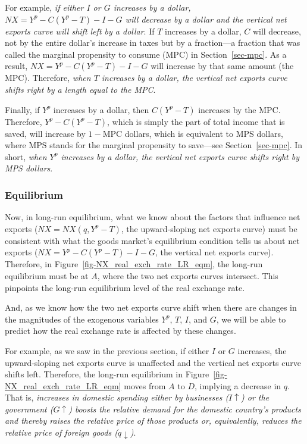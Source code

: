 \documentclass[
  letterpaper,
]{book}
\theoremstyle{plain}
\theoremstyle{remark}
\begin{document}
For example, \emph{if either \(I\) or \(G\) increases by a dollar,
\(NX=Y^p-C(Y^p-T)-I-G\) will decrease by a dollar and the vertical net
exports curve will shift left by a dollar}. If \(T\) increases by a
dollar, \(C\) will decrease, not by the entire dollar's increase in
taxes but by a fraction---a fraction that was called the marginal
propensity to consume (MPC) in Section~\ref{sec-mpc}. As a result,
\(NX=Y^p-C(Y^p-T)-I-G\) will increase by that same amount (the MPC).
Therefore, \emph{when \(T\) increases by a dollar, the vertical net
exports curve shifts right by a length equal to the MPC}.

Finally, if \(Y^p\) increases by a dollar, then \(C(Y^p-T)\) increases
by the MPC. Therefore, \(Y^p-C(Y^p-T)\), which is simply the part of
total income that is saved, will increase by \(1-\text{MPC}\) dollars,
which is equivalent to MPS dollars, where MPS stands for the marginal
propensity to save---see Section~\ref{sec-mpc}. In short, \emph{when
\(Y^p\) increases by a dollar, the vertical net exports curve shifts
right by MPS dollars}.

\subsubsection{Equilibrium}\label{sec-eqm-no-appp}

Now, in long-run equilibrium, what we know about the factors that
influence net exports (\(NX=NX(q,Y^p-T)\), the upward-sloping net
exports curve) must be consistent with what the goods market's
equilibrium condition tells us about net exports
(\(NX=Y^p-C(Y^p-T)-I-G\), the vertical net exports curve). Therefore, in
Figure~\ref{fig-NX_real_exch_rate_LR_eqm}, the long-run equilibrium must
be at \(A\), where the two net exports curves intersect. This pinpoints
the long-run equilibrium level of the real exchange rate.

And, as we know how the two net exports curve shift when there are
changes in the magnitudes of the exogenous variables \(Y^p\), \(T\),
\(I\), and \(G\), we will be able to predict how the real exchange rate
is affected by these changes.

For example, as we saw in the previous section, if either \(I\) or \(G\)
increases, the upward-sloping net exports curve is unaffected and the
vertical net exports curve shifts left. Therefore, the long-run
equilibrium in Figure~\ref{fig-NX_real_exch_rate_LR_eqm} moves from
\(A\) to \(D\), implying a decrease in \(q\). That is, \emph{increases
in domestic spending either by businesses (\(I\uparrow\)) or the
government (\(G\uparrow\)) boosts the relative demand for the domestic
country's products and thereby raises the relative price of those
products or, equivalently, reduces the relative price of foreign goods
(\(q\downarrow\))}.
\end{document}
